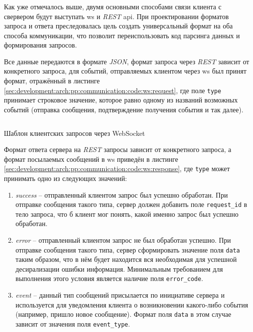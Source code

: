 \subsubsection{}
\label{sec:development:arch:pp:communication}

Как уже отмечалось выше, двумя основными способами связи клиента с свервером будут выступать \gls{ws} и \textit{REST} \gls{api}. При проектировании форматов запроса и ответа преследовалась цель создать универсальный формат на оба способа коммуникации, что позволит переиспользовать код парсинга данных и формирования запросов.

Все данные передаются в формате \textit{JSON}, формат запроса через \textit{REST} зависит от конкретного запроса, для событий, отправляемых клиентом через \gls{ws} был принят формат, отражённый в листинге \ref{sec:development:arch:pp:communication:code:ws:request}, где поле \texttt{type} принимает строковое значение, которое равно одному из названий возможных событий (отправка сообщения, подтверждение получения события и так далее).

\begin{code}
	\inputminted{json}{inc/src/client_ws_req_format.json}
   \caption{Шаблон клиентских запросов через WebSocket}
   \label{sec:development:arch:pp:communication:code:ws:request}
\end{code}

Формат ответа сервера на \textit{REST} запросы зависит от конкретного запроса, а формат посылаемых сообщений в \gls{ws} приведён в листинге \ref{sec:development:arch:pp:communication:code:ws:response}, где \texttt{type} может принимать одно из следующих значений: 

\begin{enumerate}
	\item \textit{success} -- отправленный клиентом запрос был успешно обработан. При отправке сообщения такого типа, сервер должен добавить поле \texttt{request_id} в тело запроса, что б клиент мог понять, какой именно запрос был успешно обработан.
	\item \textit{error} -- отправленный клиентом запрос не был обработан успешно. При отправке сообщения такого типа, сервер сформировать значение поля \texttt{data} таким образом, что в нём будет находится вся необходимая для успешной десирализации ошибки информация. Минимальным требованием для выполнения этого условия является наличие поля \texttt{error_code}.
	\item \textit{event} -- данный тип сообщений присылается по инициативе сервера и используется для уведомления клиента о возникновении какого-либо события (например, пришло новое сообщение). Формат поля \texttt{data} в этом случае зависит от значения поля \texttt{event_type}.
\end{enumerate}

